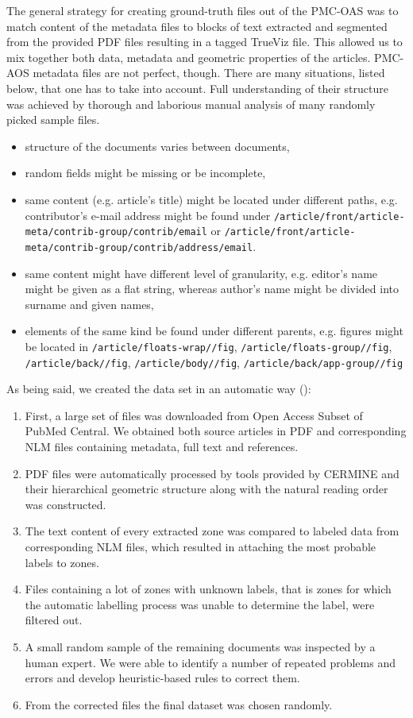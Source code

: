 The general strategy for creating ground-truth files out of the PMC-OAS was to match content of the metadata files to blocks of text extracted and segmented from the provided PDF files resulting in a tagged TrueViz file. This allowed us to mix together both data, metadata and geometric properties of the articles. PMC-AOS metadata files are not perfect, though. There are many situations, listed below, that one has to take into account. Full understanding of their structure was achieved by thorough and laborious manual analysis of many randomly picked sample files.
\begin{itemize}
\item structure of the documents varies between documents,
\item random fields might be missing or be incomplete,
\item same content (e.g. article's title) might be located under different paths, e.g. contributor's e-mail address might be found under \verb+/article/front/article-meta/contrib-group/contrib/email+ or \verb+/article/front/article-meta/contrib-group/contrib/address/email+.
\item same content might have different level of granularity, e.g. editor's name might be given as a flat string, whereas author's name might be divided into surname and given names,
\item elements of the same kind be found under different parents, e.g. figures might be located in \verb+/article/floats-wrap//fig+, \verb+/article/floats-group//fig+, \verb+/article/back//fig+, \verb+/article/body//fig+, \verb+/article/back/app-group//fig+
\end{itemize}
As being said, we created the data set in an automatic way (\cite{DominikaTkaczykPaweSzostek2014}):
\begin{enumerate}
    \item First, a large set of files was downloaded from Open Access Subset of PubMed Central. We obtained both source articles in PDF and corresponding NLM files containing metadata, full text and references.
    \item PDF files were automatically processed by tools provided by CERMINE and their hierarchical geometric structure along with the natural reading order was constructed.
    \item The text content of every extracted zone was compared to labeled data from corresponding NLM files, which resulted in attaching the most probable labels to zones.
    \item Files containing a lot of zones with unknown labels, that is zones for which the automatic labelling process was unable to determine the label, were filtered out.
    \item A small random sample of the remaining documents was inspected by a human expert. We were able to identify a number of repeated problems and errors and develop heuristic-based rules to correct them.
    \item From the corrected files the final dataset was chosen randomly.
\end{enumerate}

